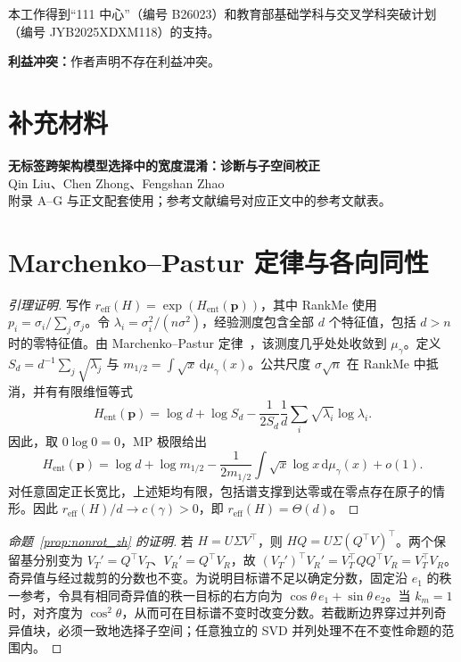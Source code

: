 \documentclass{article}
\newcommand{\reff}{\ensuremath{r_{\mathrm{eff}}}\xspace}
\begin{document}
\clearpage
\begin{ack}
本工作得到“111 中心”（编号 B26023）和教育部基础学科与交叉学科突破计划（编号 JYB2025XDXM118）的支持。

\noindent\textbf{利益冲突：}作者声明不存在利益冲突。
\end{ack}




\clearpage
\appendix
\renewcommand{\thepage}{S\arabic{page}}
\setcounter{page}{1}
\section*{补充材料}
\noindent\textbf{无标签跨架构模型选择中的宽度混淆：诊断与子空间校正}\\
Qin Liu、Chen Zhong、Fengshan Zhao\\
附录 A--G 与正文配套使用；参考文献编号对应正文中的参考文献表。
\section{Marchenko--Pastur 定律与各向同性}
\begin{proof}[引理证明]
写作 $\reff(H)=\exp(H_{\mathrm{ent}}(\mathbf p))$，其中 RankMe 使用 $p_i=\sigma_i/\sum_j\sigma_j$。令 $\lambda_i=\sigma_i^2/(n\sigma^2)$，经验测度包含全部 $d$ 个特征值，包括 $d>n$ 时的零特征值。由 Marchenko--Pastur 定律~\citep{marchenko1967distribution}，该测度几乎处处收敛到 $\mu_\gamma$。定义
$S_d=d^{-1}\sum_j\sqrt{\lambda_j}$ 与 $m_{1/2}=\int\sqrt{x}\,\mathrm d\mu_\gamma(x)$。公共尺度 $\sigma\sqrt n$ 在 RankMe 中抵消，并有有限维恒等式
\[
H_{\mathrm{ent}}(\mathbf p)=\log d+\log S_d-
\frac{1}{2S_d}\frac1d\sum_i\sqrt{\lambda_i}\log\lambda_i.
\]
因此，取 $0\log0=0$，MP 极限给出
\[
H_{\mathrm{ent}}(\mathbf p)=\log d+\log m_{1/2}-
\frac{1}{2m_{1/2}}\int\sqrt{x}\log x\,\mathrm d\mu_\gamma(x)+o(1).
\]
对任意固定正长宽比，上述矩均有限，包括谱支撑到达零或在零点存在原子的情形。因此 $\reff(H)/d\to c(\gamma)>0$，即 $\reff(H)=\Theta(d)$。
\end{proof}

\begin{proof}[命题~\ref{prop:nonrot_zh} 的证明]
若 $H=U\Sigma V^\top$，则 $HQ=U\Sigma(Q^\top V)^\top$。两个保留基分别变为 $V_T'=Q^\top V_T$、$V_R'=Q^\top V_R$，故 $(V_T')^\top V_R'=V_T^\top QQ^\top V_R=V_T^\top V_R$。奇异值与经过裁剪的分数也不变。为说明目标谱不足以确定分数，固定沿 $e_1$ 的秩一参考，令具有相同奇异值的秩一目标的右方向为 $\cos\theta\,e_1+\sin\theta\,e_2$。当 $k_m=1$ 时，对齐度为 $\cos^2\theta$，从而可在目标谱不变时改变分数。若截断边界穿过并列奇异值块，必须一致地选择子空间；任意独立的 SVD 并列处理不在不变性命题的范围内。
\end{proof}
\end{document}
